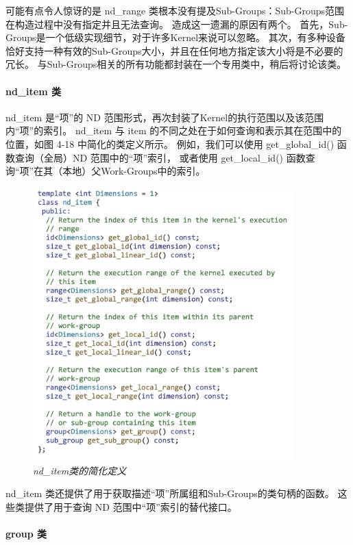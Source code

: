 可能有点令人惊讶的是 nd\_range 类根本没有提及Sub-Groups：Sub-Groups范围在构造过程中没有指定并且无法查询。 
造成这一遗漏的原因有两个。 首先，Sub-Groups是一个低级实现细节，对于许多Kernel来说可以忽略。 
其次，有多种设备恰好支持一种有效的Sub-Groups大小，并且在任何地方指定该大小将是不必要的冗长。 
与Sub-Groups相关的所有功能都封装在一个专用类中，稍后将讨论该类。

\paragraph{nd\_item 类}

nd\_item 是“项”的 ND 范围形式，再次封装了Kernel的执行范围以及该范围内“项”的索引。 
nd\_item 与 item 的不同之处在于如何查询和表示其在范围中的位置，如图 4-18 中简化的类定义所示。 
例如，我们可以使用 get\_global\_id() 函数查询（全局）ND 范围中的“项”索引，
或者使用 get\_local\_id() 函数查询“项”在其（本地）父Work-Groups中的索引。

\begin{figure}[H]
	\centering
	\includegraphics[width=0.9\textwidth]{figs/F4.18.png}
	\caption{\textit{nd\_item类的简化定义}}
\end{figure}

nd\_item 类还提供了用于获取描述“项”所属组和Sub-Groups的类句柄的函数。 
这些类提供了用于查询 ND 范围中“项”索引的替代接口。

\paragraph{group 类}

